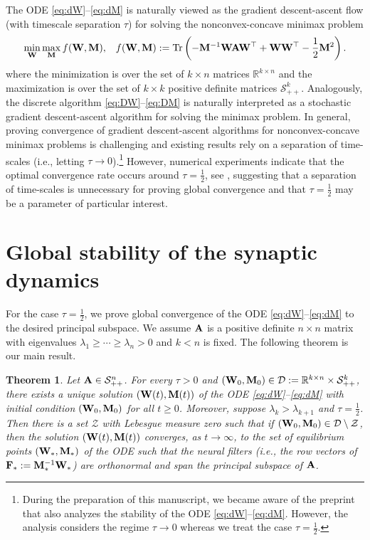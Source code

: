 \documentclass[11pt]{article}
\newtheorem{theorem}{Theorem}
\theoremstyle{definition}
\DeclareMathOperator{\tr}{Tr}
\newcommand{\A}{{\bf A}}
\newcommand{\F}{{\bf F}}
\newcommand{\M}{{\bf M}}
\newcommand{\R}{\mathbb{R}}
\newcommand{\W}{{\bf W}}
\newcommand{\calD}{\mathcal{D}}
\newcommand{\calS}{\mathcal{S}}
\newcommand{\calZ}{\mathcal{Z}}
\begin{document}
The ODE \eqref{eq:dW}--\eqref{eq:dM} is naturally viewed as the gradient descent-ascent flow (with timescale separation $\tau$) for solving the nonconvex-concave minimax problem
\begin{align}\label{eq:minimax}
    \min_\W\max_\M f(\W,\M),&&f(\W,\M):=\tr\left(-\M^{-1}\W\A\W^\top+\W\W^\top-\frac12\M^2\right).
\end{align}
where the minimization is over the set of $k\times n$ matrices $\R^{k\times n}$ and the maximization is over the set of $k\times k$ positive definite matrices $\calS_{++}^k$. Analogously, the discrete algorithm \eqref{eq:DW}--\eqref{eq:DM} is naturally interpreted as a stochastic gradient descent-ascent algorithm for solving the minimax problem. In general, proving convergence of gradient descent-ascent algorithms for nonconvex-concave minimax problems is challenging and existing results \citep{borkar1997stochastic,lin2020gradient,centorrino2025similarity} rely on a separation of time-scales (i.e., letting $\tau\to0$).\footnote{During the preparation of this manuscript, we became aware of the preprint \citep{centorrino2025similarity} that also analyzes the stability of the ODE \eqref{eq:dW}--\eqref{eq:dM}. However, the analysis considers the regime $\tau\to0$ whereas we treat the case $\tau=\frac12$.} However, numerical experiments indicate that the optimal convergence rate occurs around $\tau=\frac12$, see \cite[Figure 4]{pehlevan2018similarity}, suggesting that a separation of time-scales is unnecessary for proving global convergence and that $\tau=\frac12$ may be a parameter of particular interest.

\section{Global stability of the synaptic dynamics}

For the case $\tau=\frac12$, we prove global convergence of the ODE \eqref{eq:dW}--\eqref{eq:dM} to the desired principal subspace. We assume $\A$ is a positive definite $n\times n$ matrix with eigenvalues $\lambda_1\ge\cdots\ge\lambda_n>0$ and $k<n$ is fixed. The following theorem is our main result.

\begin{theorem}\label{thm:aeconvergence}
    Let $\A\in\calS_{++}^n$.
    For every $\tau>0$ and $(\W_0,\M_0)\in\calD:=\R^{k\times n}\times\calS_{++}^k$, there exists a unique solution $(\W(t),\M(t))$ of the ODE \eqref{eq:dW}--\eqref{eq:dM} with initial condition $(\W_0,\M_0)$ for all $t\ge0$. Moreover, suppose $\lambda_k>\lambda_{k+1}$ and $\tau=\frac12$. Then there is a set $\calZ$ with Lebesgue measure zero such that if $(\W_0,\M_0)\in\calD\setminus\calZ$, then the solution $(\W(t),\M(t))$ converges, as $t\to\infty$, to the set of equilibrium points $(\W_\ast,\M_\ast)$ of the ODE such that the neural filters (i.e., the row vectors of $\F_\ast:=\M_\ast^{-1}\W_\ast$) are orthonormal and span the principal subspace of $\A$.
\end{theorem}
\end{document}
